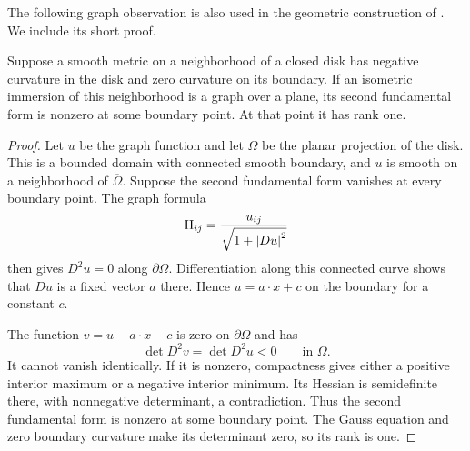 The following graph observation is also used in the geometric
construction of \cite[Section~2, Step~3]{NY2002}. We include its short proof.

\begin{lemma}\label{lem:disk}
Suppose a smooth metric on a neighborhood of a closed disk
has negative curvature in the disk and zero curvature on its
boundary. If an isometric immersion of this neighborhood is
a graph over a plane, its second fundamental form is nonzero
at some boundary point. At that point it has rank one.
\end{lemma}

\begin{proof}
Let \(u\) be the graph function and let \(\Omega\) be the planar
projection of the disk. This is a bounded domain with connected
smooth boundary, and \(u\) is smooth on a neighborhood of
\(\overline\Omega\). Suppose the second fundamental form vanishes
at every boundary point. The graph formula
\[
\mathrm{II}_{ij}=\frac{u_{ij}}{\sqrt{1+\left\lvert Du\right\rvert^2}}
\]
then gives \(D^2u=0\) along \(\partial\Omega\). Differentiation
along this connected curve shows that \(Du\) is a fixed vector
\(a\) there. Hence \(u=a\cdot x+c\) on the boundary for a constant
\(c\).

The function \(v=u-a\cdot x-c\) is zero on \(\partial\Omega\)
and has
\[
\det D^2v=\det D^2u<0\qquad\text{in }\Omega.
\]
It cannot vanish identically. If it is nonzero, compactness
gives either a positive interior maximum or a negative interior
minimum. Its Hessian is semidefinite there, with nonnegative
determinant, a contradiction.
Thus the second fundamental form is nonzero at some boundary
point. The Gauss equation and zero boundary curvature make
its determinant zero, so its rank is one.
\end{proof}

